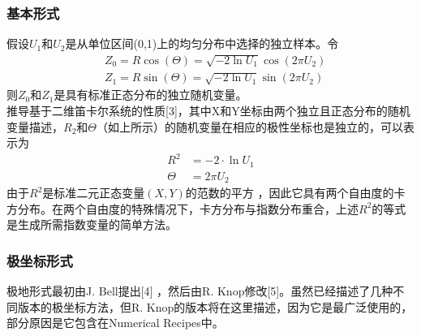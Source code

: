 \documentclass[twoside,twocolumn]{article}
\begin{document}
\begin{CJK*}{UTF8}{gkai}
	\subsubsection{基本形式}
	假设$U_{1}$和$U_{2}$是从单位区间(0,1)上的均匀分布中选择的独立样本。令
	\begin{equation*}
	\begin{aligned}
	&Z_{0}=R\cos(\Theta)=\sqrt{-2\ln U_{1}}\cos(2\pi U_{2})\\
	&Z_{1}=R\sin(\Theta)=\sqrt{-2\ln U_{1}}\sin(2\pi U_{2})
	\end{aligned}
	\end{equation*}
	则$Z_{0}$和$Z_{1}$是具有标准正态分布的独立随机变量。\\
	推导基于二维笛卡尔系统的性质[3]，其中X和Y坐标由两个独立且正态分布的随机变量描述，$R_{2}$和$\Theta$（如上所示）的随机变量在相应的极性坐标也是独立的，可以表示为
	\begin{equation*}
	\begin{aligned}
		R^{2}&=-2\cdot \ln U_{1}\\
		\Theta&=2\pi U_{2}
	\end{aligned}
	\end{equation*}
	由于$R^{2}$是标准二元正态变量$(X,Y)$的范数的平方 ，因此它具有两个自由度的卡方分布。在两个自由度的特殊情况下，卡方分布与指数分布重合，上述$R^{2}$的等式是生成所需指数变量的简单方法。
	\subsubsection{极坐标形式}
	极地形式最初由J. Bell提出[4] ，然后由R. Knop修改[5]。虽然已经描述了几种不同版本的极坐标方法，但R. Knop的版本将在这里描述，因为它是最广泛使用的，部分原因是它包含在Numerical Recipes中。


\end{CJK*}
\end{document}
